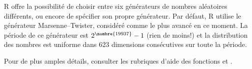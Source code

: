 
R offre la possibilité de choisir entre six générateurs de
nombres aléatoires différents, ou encore de spécifier son propre
générateur. Par défaut, R utilise le générateur
Marsenne--Twister, considéré comme le plus avancé en ce moment.  La
période de ce générateur est $2^{\nombre{19937}} - 1$ (rien de moins!)
et la distribution des nombres est uniforme dans 623 dimensions
consécutives sur toute la période.

Pour de plus amples détails, consulter les rubriques d'aide des
fonctions  et .



